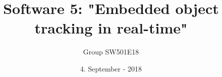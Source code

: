 \title{Software 5: "Embedded object tracking in real-time"} %
\date{4. September - 2018}                                                        %
\def\groupnumber{Group SW501E18}                                                  %
\author{\groupnumber}                                                             %

\let\theauthor\author
\let\thedate\date


